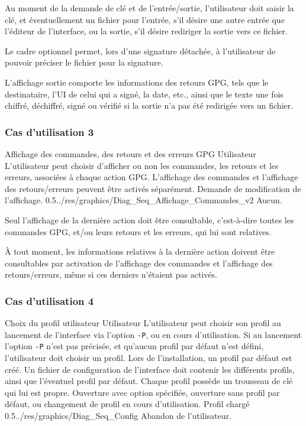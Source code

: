 \documentclass{../res/univ-projet}
\begin{document}
Au moment de la demande de clé et de l'entrée/sortie, l'utilisateur doit saisir la clé, et éventuellement un fichier pour l'entrée, s'il désire une autre entrée que l'éditeur de l'interface, ou la sortie, s'il désire rediriger la sortie vers ce fichier.

Le cadre optionnel permet, lors d'une signature détachée, à l'utilisateur de pouvoir préciser le fichier pour la signature.

L'affichage sortie comporte les informations des retours GPG, tels que le destinataire, l'UI de celui qui a signé, la date, etc., ainsi que le texte une fois chiffré, déchiffré, signé ou vérifié si la sortie n'a pas été redirigée vers un fichier.

\subsubsection{Cas d'utilisation 3}
\ficheGraphic
{Affichage des commandes, des retours et des erreurs GPG}
{Utilisateur}
{L'utilisateur peut choisir d'afficher ou non les commandes, les retours et les erreurs, associées à chaque action GPG. L'affichage des commandes et l'affichage des retours/erreurs peuvent être activés séparément.}
{}
{Demande de modification de l'affichage.}
{}
{0.5}{../res/graphics/Diag_Seq_Affichage_Commandes_v2}
{Aucun.}   
\vspace{0.5cm}

Seul l'affichage de la dernière action doit être consultable, c'est-à-dire toutes les commandes GPG, et/ou leurs retours et les erreurs, qui lui sont relatives.

\`{A} tout moment, les informations relatives à la dernière action doivent être consultables par activation de l'affichage des commandes et l'affichage des retours/erreurs, même si ces derniers n'étaient pas activés.


\subsubsection{Cas d'utilisation 4}
\ficheGraphic
{Choix du profil utilisateur}
{Utilisateur}
{L'utilisateur peut choisir son profil au lancement de l'interface via l'option \texttt{-P}, ou en cours d'utilisation. Si au lancement l'option \texttt{-P} n'est pas précisée, et qu'aucun profil par défaut n'est défini, l'utilisateur doit choisir un profil. Lors de l'installation, un profil par défaut est créé.}
{Un fichier de configuration de l'interface doit contenir les différents profils, ainsi que l'éventuel profil par défaut. 
Chaque profil possède un trousseau de clé qui lui est propre.}
{Ouverture avec option spécifiée, ouverture sans profil par défaut, ou changement de profil en cours d'utilisation.}
{Profil chargé}
{0.5}{../res/graphics/Diag_Seq_Config}
{Abandon de l'utilisateur.}
\vspace{0.5cm}
\end{document}
